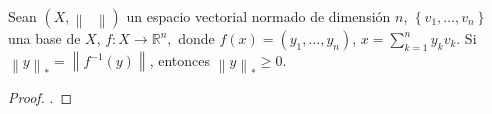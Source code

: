 \begin{proposition*}
    Sean $\left(X, \left\|\phantom{\cdot}\right\|\right)$
    un espacio vectorial normado de dimensión $n$,
    \begin{math}
        \left\{
        v_{1},\dotsc,
        v_{n}
        \right\}
    \end{math}
    una base de $X$,
    \begin{math}
        f\colon X\to\mathbb{R}^{n},
    \end{math}
    donde
    \begin{math}
        f\left(x\right)=
        \left(y_{1},\dotsc,y_{n}\right)
    \end{math},
    \begin{math}
        x=
        \sum_{k=1}^{n}
        y_{k}v_{k}
    \end{math}.
    Si
    \begin{math}
        {\left\|y\right\|}_{\ast}=
        \left\|f^{-1}\left(y\right)\right\|
    \end{math},
    entonces
    \begin{math}
        {\left\|y\right\|}_{\ast}\geq
        0
    \end{math}.
\end{proposition*}

\begin{proof}
    .
\end{proof}